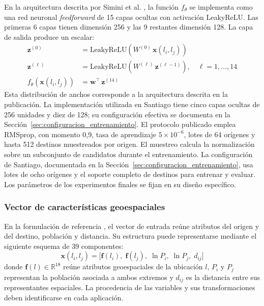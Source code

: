 En la arquitectura descrita por Simini et al. \cite{simini2021deep}, la función $f_\theta$ se implementa como una red neuronal \textit{feedforward} de 15 capas ocultas con activación LeakyReLU. Las primeras 6 capas tienen dimensión 256 y las 9 restantes dimensión 128. La capa de salida produce un escalar:
\begin{align}
    \mathbf{z}^{(0)} &= \text{LeakyReLU}\!\left(W^{(0)}\,\mathbf{x}(l_i, l_j)\right) \nonumber \\
    \mathbf{z}^{(\ell)} &= \text{LeakyReLU}\!\left(W^{(\ell)}\,\mathbf{z}^{(\ell-1)}\right), \quad \ell = 1, \dots, 14 \nonumber \\
    f_\theta\!\left(\mathbf{x}(l_i, l_j)\right) &= \mathbf{w}^{\top}\,\mathbf{z}^{(14)}
    \label{eq:dg_red}
\end{align}
Esta distribución de anchos corresponde a la arquitectura descrita en la publicación. La implementación utilizada en Santiago tiene cinco capas ocultas de 256 unidades y diez de 128; su configuración efectiva se documenta en la Sección~\ref{sec:configuracion_entrenamiento}.
El protocolo publicado emplea RMSprop, con momento 0,9, tasa de aprendizaje $5\times10^{-6}$, lotes de 64 orígenes y hasta 512 destinos muestreados por origen. El muestreo calcula la normalización sobre un subconjunto de candidatos durante el entrenamiento. La configuración de Santiago, documentada en la Sección~\ref{sec:configuracion_entrenamiento}, usa lotes de ocho orígenes y el soporte completo de destinos para entrenar y evaluar. Los parámetros de los experimentos finales se fijan en su diseño específico.

\subsubsection{Vector de características geoespaciales}

En la formulación de referencia \cite{simini2021deep}, el vector de entrada reúne atributos del origen y del destino, población y distancia. Su estructura puede representarse mediante el siguiente esquema de 39 componentes:
\begin{equation}
    \mathbf{x}(l_i, l_j) = \bigl[\mathbf{f}(l_i),\; \mathbf{f}(l_j),\; \ln P_i,\; \ln P_j,\; d_{ij}\bigr]
    \label{eq:dg_features}
\end{equation}
donde $\mathbf{f}(l)\in\mathbb{R}^{18}$ reúne atributos geoespaciales de la ubicación $l$, $P_i$ y $P_j$ representan la población asociada a ambos extremos y $d_{ij}$ es la distancia entre sus representantes espaciales. La procedencia de las variables y sus transformaciones deben identificarse en cada aplicación.

